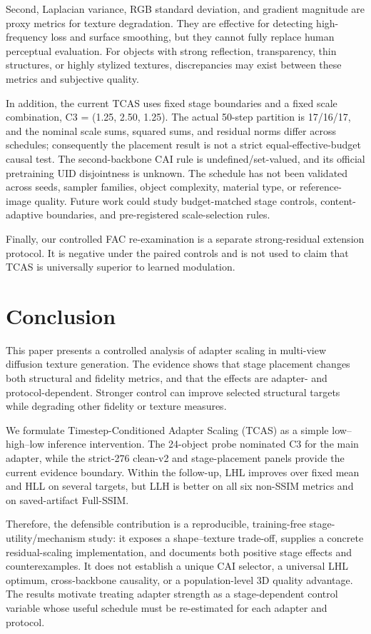 \documentclass[times,twocolumn,final]{elsarticle}
\begin{document}
Second, Laplacian variance, RGB standard deviation, and gradient magnitude are proxy metrics for texture degradation. They are effective for detecting high-frequency loss and surface smoothing, but they cannot fully replace human perceptual evaluation. For objects with strong reflection, transparency, thin structures, or highly stylized textures, discrepancies may exist between these metrics and subjective quality.

In addition, the current TCAS uses fixed stage boundaries and a fixed scale combination, C3 = (1.25, 2.50, 1.25). The actual 50-step partition is 17/16/17, and the nominal scale sums, squared sums, and residual norms differ across schedules; consequently the placement result is not a strict equal-effective-budget causal test. The second-backbone CAI rule is undefined/set-valued, and its official pretraining UID disjointness is unknown. The schedule has not been validated across seeds, sampler families, object complexity, material type, or reference-image quality. Future work could study budget-matched stage controls, content-adaptive boundaries, and pre-registered scale-selection rules.

Finally, our controlled FAC re-examination is a separate strong-residual extension protocol. It is negative under the paired controls and is not used to claim that TCAS is universally superior to learned modulation.


\section{Conclusion}
\label{sec:conclusion}

This paper presents a controlled analysis of adapter scaling in multi-view diffusion texture generation. The evidence shows that stage placement changes both structural and fidelity metrics, and that the effects are adapter- and protocol-dependent. Stronger control can improve selected structural targets while degrading other fidelity or texture measures.

We formulate Timestep-Conditioned Adapter Scaling (TCAS) as a simple low--high--low inference intervention. The 24-object probe nominated C3 for the main adapter, while the strict-276 clean-v2 and stage-placement panels provide the current evidence boundary. Within the follow-up, LHL improves over fixed mean and HLL on several targets, but LLH is better on all six non-SSIM metrics and on saved-artifact Full-SSIM.

Therefore, the defensible contribution is a reproducible, training-free stage-utility/mechanism study: it exposes a shape--texture trade-off, supplies a concrete residual-scaling implementation, and documents both positive stage effects and counterexamples. It does not establish a unique CAI selector, a universal LHL optimum, cross-backbone causality, or a population-level 3D quality advantage. The results motivate treating adapter strength as a stage-dependent control variable whose useful schedule must be re-estimated for each adapter and protocol.
\end{document}
